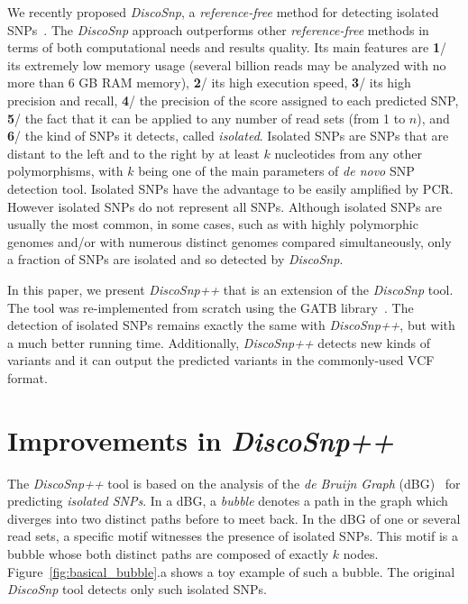 \documentclass{bmcart}
\newcommand{\disco}{{\it DiscoSnp}\xspace}
\newcommand{\discopp}{{\it DiscoSnp++}\xspace}
\begin{document}
We recently proposed \disco, a \emph{reference-free} method for detecting isolated SNPs~\cite{Uricaru2014a}. The \disco approach outperforms other \emph{reference-free} methods in terms of both computational needs and results quality. Its main features are \textbf{1}/ its extremely low memory usage (several billion reads may be analyzed with no more than 6 GB RAM memory), \textbf{2}/ its high execution speed, \textbf{3}/ its high precision and recall, \textbf{4}/ the precision of the score assigned to each predicted SNP, \textbf{5}/ the fact that it can be applied to any number of read sets (from 1 to $n$), and \textbf{6}/ the kind of SNPs it detects, called \emph{isolated}. Isolated SNPs are SNPs that are distant to the left and to the right by at least $k$ nucleotides from any other polymorphisms, with $k$ being one of the main parameters of \emph{de novo}
SNP detection tool. Isolated SNPs have the advantage to be easily amplified by PCR. However isolated SNPs do not represent all SNPs. Although isolated SNPs are usually the most common, in some cases, such as with highly polymorphic genomes and/or with numerous distinct genomes compared simultaneously, only a fraction of SNPs are isolated and so detected by \disco.


In this paper, we present \discopp that is an extension of the \disco tool. The tool was re-implemented from scratch using the GATB library~\cite{Drezen2014}. The detection of isolated SNPs remains exactly the same with \discopp, but with a much better running time. Additionally, \discopp detects new kinds of variants and it can output the predicted variants in the commonly-used VCF format.  



\section*{Improvements in \discopp}



The \discopp tool is based on the analysis of the \emph{de Bruijn Graph} (dBG)~\cite{DBGPAPERXXX(Pevzner2004?)} for predicting \emph{isolated SNPs}.
In a dBG, a \emph{bubble} denotes a path in the graph which diverges into two distinct paths before to meet back. In the dBG of one or several read sets, a specific motif witnesses the presence of isolated SNPs. This motif is a bubble whose both distinct paths are composed of exactly $k$ nodes. Figure~\ref{fig:basical_bubble}.a shows a toy example of such a bubble. The original \disco tool detects only such isolated SNPs. 
\end{document}

